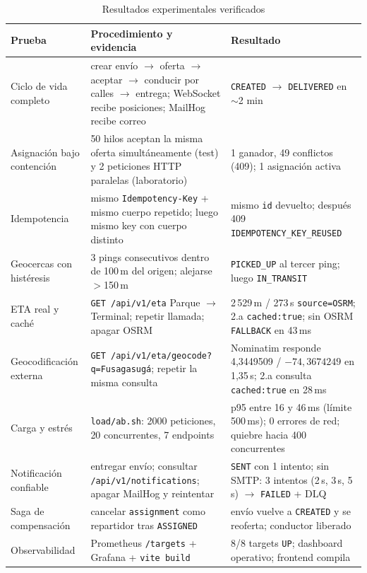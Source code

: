 \documentclass[conference]{IEEEtran}
\newcommand{\pkg}[1]{\texttt{#1}}
\begin{document}
\begin{table}[t]
\centering
\caption{Resultados experimentales verificados}
\label{tab:resultados}
\small
\begin{tabular}{@{}L{3.8cm}L{7.2cm}C{3.2cm}@{}}
\toprule
\textbf{Prueba} & \textbf{Procedimiento y evidencia} & \textbf{Resultado}\\
\midrule
Ciclo de vida completo & crear env\'io $\rightarrow$ oferta $\rightarrow$ aceptar $\rightarrow$
conducir por calles $\rightarrow$ entrega; WebSocket recibe posiciones; MailHog recibe correo &
\texttt{CREATED} $\rightarrow$ \texttt{DELIVERED} en $\sim$2 min \\
Asignaci\'on bajo contenci\'on & 50 hilos aceptan la misma oferta simult\'aneamente (test) y
2 peticiones HTTP paralelas (laboratorio) & 1 ganador, 49 conflictos (409); 1 asignaci\'on activa \\
Idempotencia & mismo \pkg{Idempotency-Key} + mismo cuerpo repetido; luego mismo key con cuerpo distinto &
mismo \texttt{id} devuelto; despu\'es 409 \pkg{IDEMPOTENCY\_KEY\_REUSED} \\
Geocercas con hist\'eresis & 3 pings consecutivos dentro de 100\,m del origen; alejarse $>$150\,m &
\texttt{PICKED\_UP} al tercer ping; luego \texttt{IN\_TRANSIT} \\
ETA real y cach\'e & \pkg{GET /api/v1/eta} Parque $\rightarrow$ Terminal; repetir llamada; apagar OSRM &
2\,529\,m / 273\,s \pkg{source=OSRM}; 2.a \pkg{cached:true}; sin OSRM \pkg{FALLBACK} en 43\,ms \\
Geocodificaci\'on externa & \pkg{GET /api/v1/eta/geocode?q=Fusagasug\'a}; repetir la misma consulta &
Nominatim responde 4,3449509 / $-74,3674249$ en 1,35\,s; 2.a consulta \pkg{cached:true} en 28\,ms \\
Carga y estr\'es & \pkg{load/ab.sh}: 2000 peticiones, 20 concurrentes, 7 endpoints &
p95 entre 16 y 46\,ms (l\'imite 500\,ms); 0 errores de red; quiebre hacia 400 concurrentes \\
Notificaci\'on confiable & entregar env\'io; consultar \pkg{/api/v1/notifications}; apagar MailHog y reintentar &
\texttt{SENT} con 1 intento; sin SMTP: 3 intentos (2\,s, 3\,s, 5\,s) $\rightarrow$ \texttt{FAILED} + DLQ \\
Saga de compensaci\'on & cancelar \pkg{assignment} como repartidor tras \texttt{ASSIGNED} &
env\'io vuelve a \texttt{CREATED} y se reoferta; conductor liberado \\
Observabilidad & Prometheus \pkg{/targets} + Grafana + \pkg{vite build} &
8/8 targets \texttt{UP}; dashboard operativo; frontend compila \\
\bottomrule
\end{tabular}
\end{table}
\end{document}
